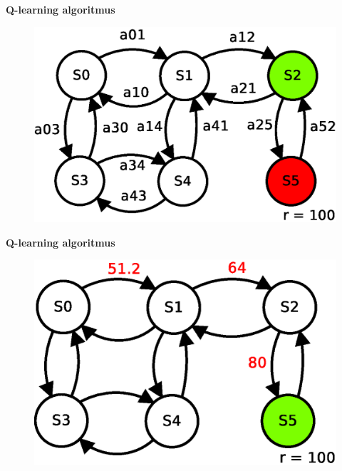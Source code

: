 \documentclass[xcolor=dvipsnames]{beamer}
\begin{document}
\begin{frame}{\bf Q-learning algoritmus}

\begin{figure}[!htb]
\includegraphics[scale=.5]{../diagrams/q_learning_table_03.eps}
\end{figure}

\end{frame}

\begin{frame}{\bf Q-learning algoritmus}

\begin{figure}[!htb]
\includegraphics[scale=.5]{../diagrams/q_learning_table_04.eps}
\end{figure}

\end{frame}
\end{document}
